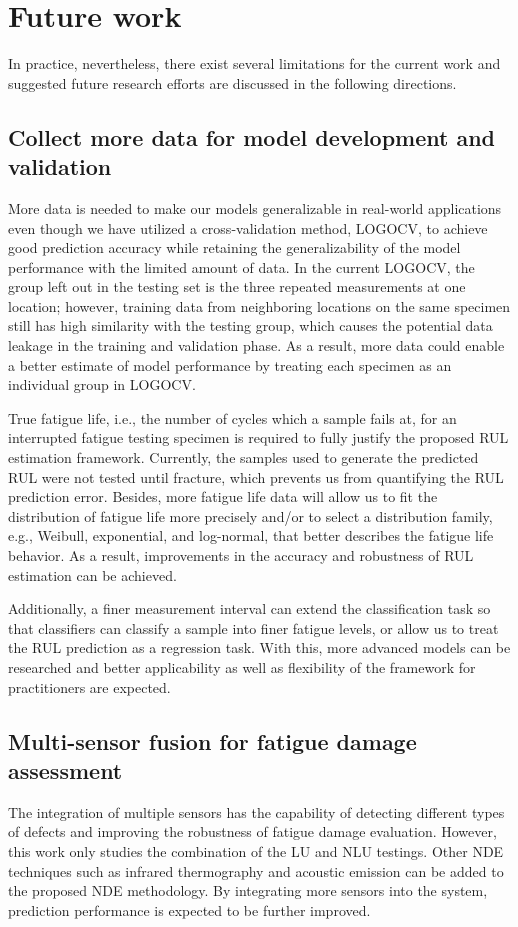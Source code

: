 \section{Future work}
In practice, nevertheless, there exist several limitations for the current work and suggested future research efforts are discussed in the following directions.

\subsection{Collect more data for model development and validation}
More data is needed to make our models generalizable in real-world applications even though we have utilized a cross-validation method, LOGOCV, to achieve good prediction accuracy while retaining the generalizability of the model performance with the limited amount of data. In the current LOGOCV, the group left out in the testing set is the three repeated measurements at one location; however, training data from neighboring locations on the same specimen still has high similarity with the testing group, which causes the potential data leakage in the training and validation phase. As a result, more data could enable a better estimate of model performance by treating each specimen as an individual group in LOGOCV.

True fatigue life, i.e., the number of cycles which a sample fails at, for an interrupted fatigue testing specimen is required to fully justify the proposed RUL estimation framework. Currently, the samples used to generate the predicted RUL were not tested until fracture, which prevents us from quantifying the RUL prediction error. Besides, more fatigue life data will allow us to fit the distribution of fatigue life more precisely and/or to select a distribution family, e.g., Weibull, exponential, and log-normal, that better describes the fatigue life behavior. As a result, improvements in the accuracy and robustness of RUL estimation can be achieved.

Additionally, a finer measurement interval can extend the classification task so that classifiers can classify a sample into finer fatigue levels, or allow us to treat the RUL prediction as a regression task. With this, more advanced models can be researched and better applicability as well as flexibility of the framework for practitioners are expected.

\subsection{Multi-sensor fusion for fatigue damage assessment}
The integration of multiple sensors has the capability of detecting different types of defects and improving the robustness of fatigue damage evaluation. However, this work only studies the combination of the LU and NLU testings. Other NDE techniques such as infrared thermography and acoustic emission can be added to the proposed NDE methodology. By integrating more sensors into the system, prediction performance is expected to be further improved.

